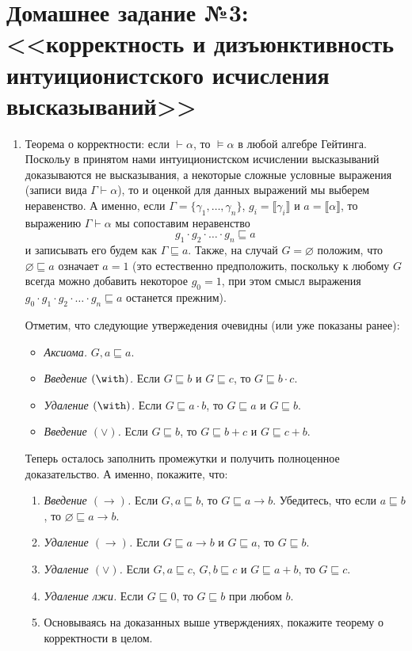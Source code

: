 \documentclass[10pt,a4paper,oneside]{article}
\begin{document}
\section*{Домашнее задание №3: <<корректность и дизъюнктивность интуиционистского исчисления высказываний>>}
\begin{enumerate}

\item Теорема о корректности: если $\vdash \alpha$, то $\models \alpha$ в любой алгебре Гейтинга.
Поскольу в принятом нами интуиционистском исчислении высказываний доказываются не высказывания, а
некоторые сложные условные выражения (записи вида $\Gamma \vdash \alpha$), то и оценкой для
данных выражений мы выберем неравенство. А именно, 
если $\Gamma = \{\gamma_1, \dots, \gamma_n\}$, $g_i = \llbracket \gamma_i \rrbracket$ и
$a = \llbracket \alpha \rrbracket$, то выражению $\Gamma \vdash \alpha$ мы сопоставим неравенство
$$g_1 \cdot g_2 \cdot \dots \cdot g_n \sqsubseteq a$$
и записывать его будем как $\Gamma \sqsubseteq a$.
Также, на случай $G = \varnothing$ положим, что $\varnothing \sqsubseteq a$ означает $a = 1$
(это естественно предположить, поскольку к любому $G$ всегда можно добавить некоторое 
$g_0 = 1$, при этом смысл выражения $g_0 \cdot g_1 \cdot g_2 \cdot \dots \cdot g_n \sqsubseteq a$ 
останется прежним).

Отметим, что следующие утвержедения очевидны (или уже показаны ранее):
\begin{itemize}
\item \emph{Аксиома.} $G,a \sqsubseteq a$.
\item \emph{Введение $(\with)$.} Если $G \sqsubseteq b$ и $G \sqsubseteq c$, то $G \sqsubseteq b \cdot c$.
\item \emph{Удаление $(\with)$.} Если $G \sqsubseteq a \cdot b$, то $G \sqsubseteq a$ и $G \sqsubseteq b$.
\item \emph{Введение $(\vee)$.} Если $G \sqsubseteq b$, то $G \sqsubseteq b + c$ и $G \sqsubseteq c + b$.
\end{itemize}

Теперь осталось заполнить промежутки и получить полноценное доказательство.
А именно, покажите, что:

\begin{enumerate}
\item \emph{Введение $(\to)$.} Если $G,a \sqsubseteq b$, то $G \sqsubseteq a \to b$.
Убедитесь, что если $a \sqsubseteq b$, то $\varnothing \sqsubseteq a \to b$.
\item \emph{Удаление $(\to)$.} Если $G \sqsubseteq a \to b$ и $G \sqsubseteq a$, то $G \sqsubseteq b$.
\item \emph{Удаление $(\vee)$.} Если $G,a \sqsubseteq c$, $G,b \sqsubseteq c$ и $G \sqsubseteq a+b$,
то $G \sqsubseteq c$.
\item \emph{Удаление лжи.} Если $G \sqsubseteq 0$, то $G \sqsubseteq b$ при любом $b$.
\item Основываясь на доказанных выше утверждениях, покажите теорему о корректности в целом.
\end{enumerate}


\end{enumerate}
\end{document}
